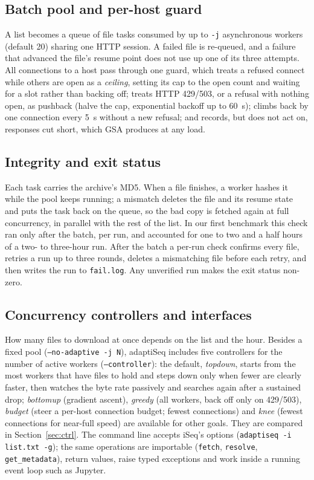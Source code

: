 \documentclass[conference]{IEEEtran}
\begin{document}
\subsection{Batch pool and per-host guard}
A list becomes a queue of file tasks consumed by up to \texttt{-j} asynchronous workers (default 20) sharing one HTTP session. A failed file is re-queued, and a failure that advanced the file's resume point does not use up one of its three attempts. All connections to a host pass through one guard, which treats a refused connect while others are open as a \emph{ceiling}, setting its cap to the open count and waiting for a slot rather than backing off; treats HTTP 429/503, or a refusal with nothing open, as pushback (halve the cap, exponential backoff up to 60~s); climbs back by one connection every 5~s without a new refusal; and records, but does not act on, responses cut short, which GSA produces at any load.

\subsection{Integrity and exit status}
Each task carries the archive's MD5. When a file finishes, a worker hashes it while the pool keeps running; a mismatch deletes the file and its resume state and puts the task back on the queue, so the bad copy is fetched again at full concurrency, in parallel with the rest of the list. In our first benchmark this check ran only after the batch, per run, and accounted for one to two and a half hours of a two- to three-hour run. After the batch a per-run check confirms every file, retries a run up to three rounds, deletes a mismatching file before each retry, and then writes the run to \texttt{fail.log}. Any unverified run makes the exit status non-zero.

\subsection{Concurrency controllers and interfaces}
How many files to download at once depends on the list and the hour. Besides a fixed pool (\texttt{--no-adaptive -j N}), adaptiSeq includes five controllers for the number of active workers (\texttt{--controller}): the default, \emph{topdown}, starts from the most workers that have files to hold and steps down only when fewer are clearly faster, then watches the byte rate passively and searches again after a sustained drop; \emph{bottomup} (gradient ascent), \emph{greedy} (all workers, back off only on 429/503), \emph{budget} (steer a per-host connection budget; fewest connections) and \emph{knee} (fewest connections for near-full speed) are available for other goals. They are compared in Section~\ref{sec:ctrl}. The command line accepts iSeq's options (\texttt{adaptiseq -i list.txt -g}); the same operations are importable (\texttt{fetch}, \texttt{resolve}, \texttt{get\_metadata}), return values, raise typed exceptions and work inside a running event loop such as Jupyter.
\end{document}
